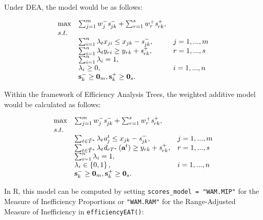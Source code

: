 Under DEA, the model would be as follows:

\begin{equation} \label{(32)} 
\begin{array}{lllll} 
{} & {\max } & {\sum_{j=1}^{m}w_{j}^{-} {\it s}_{jk}^{-} + \sum_{r=1}^{s}w_{r}^{+} {\it s}_{rk}^{+},} & {} & {} \\
{} & {s.t.} & {} & {} & {} \\ 
{} & {} & {\sum_{i=1}^{n}\lambda_{t} x_{ji} \le x_{jk} - {\it s}_{jk}^{-} ,} & {j=1,...,m} & {} \\ 
{} & {} & {\sum_{i=1}^{n}\lambda_{t} y_{ri} \ge y_{rk} + {\it s}_{rk}^{+} ,} & {r=1,...,s} & {} \\ 
{} & {} & {\sum_{i=1}^{n}\lambda_{i} = 1,} & {} & {} \\ 
{} & {} & {\lambda _{i} \ge 0,} & {i=1,...,n} & {} \\ 
{} & {} & {{\it \textbf{s}}_{k}^{-} \ge \textbf{0}_{m}, {\it \textbf{s}}_{k}^{+} \ge \textbf{0}_{s}.} 
\end{array}
\end{equation}

Within the framework of Efficiency Analysis Trees, the weighted additive
model would be calculated as follows:

\begin{equation} \label{(33)} 
\begin{array}{lllll} 
{} & {\max } & {\sum_{j=1}^{m}w_{j}^{-} {\it s}_{jk}^{-} +\sum_{r=1}^{s}w_{r}^{+} {\it s}_{rk}^{+},} & {} & {} \\ 
{} & {s.t.} & {} & {} & {} \\ 
{} & {} & {\sum_{t\in \tilde{T}^{*}}^{}\lambda_{t} {\it a}_{j}^{t}  \le x_{jk} - {\it s}_{jk}^{-} ,} & {j=1,...,m} & {} \\
{} & {} & {\sum_{t\in \tilde{T}^{*}}^{}\lambda_{t} {\it d}_{rT^{*}} \left({\it \textbf{a}}^{t} \right) \ge y_{rk} +{\it s}_{rk}^{+} ,} & {r=1,...,s} & {} \\ 
{} & {} & {\sum_{i=1}^{n}\lambda_{i} = 1,} & {} & {} \\ 
{} & {} & {\lambda _{i} \in \left\{0,1\right\},} & {i=1,...,n} & {} \\ 
{} & {} & {{\it \textbf{s}}_{k}^{-} \ge \textbf{0}_{m}, {\it \textbf{s}}_{k}^{+} \ge \textbf{0}_{s}.} 
\end{array}
\end{equation}

In R, this model can be computed by setting
\texttt{scores\_model\ =\ "WAM.MIP"} for the Measure of Inefficiency
Proportions or \texttt{"WAM.RAM"} for the Range-Adjusted Measure of
Inefficiency \citep{cooper1999} in \texttt{efficiencyEAT()}:

